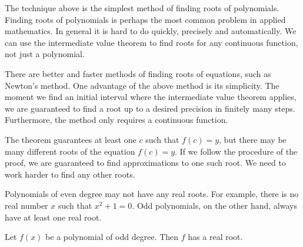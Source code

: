\documentclass[12pt]{book}
\begin{document}
The technique above is the simplest method of finding roots of polynomials.
Finding roots of polynomials is perhaps the most common problem in applied
mathematics.
In general it is hard to do quickly, precisely
and automatically.
We can use the intermediate value theorem to find
roots for any continuous function, not just a polynomial.

There are better and faster methods of finding roots of equations, such
as Newton's method.
One advantage of the above method is its
simplicity.
The
moment we find an initial interval where the intermediate value theorem
applies, we are guaranteed to find a root up to a desired
precision in finitely many steps.
Furthermore, the method only requires
a continuous function.

The theorem guarantees at least one $c$ such that $f(c) = y$, but there
may be many different roots of the equation $f(c) = y$.
If we follow
the procedure of the proof, we are guaranteed to find approximations to
one such root.
We need to work harder to find any other roots.

Polynomials of even degree may not have any real roots.
For example,
there is no real number $x$ such that $x^2+1 = 0$.
Odd polynomials, on the
other hand, always have at least one real root.

\begin{prop}
Let $f(x)$ be a polynomial of odd degree.
Then $f$ has a real root.
\end{prop}
\end{document}
